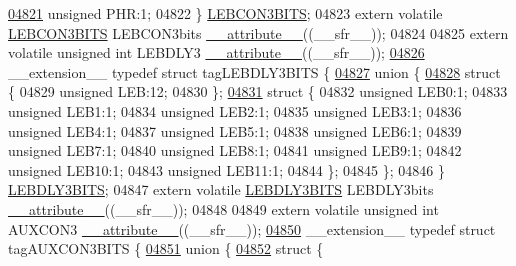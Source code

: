 \begin{DoxyCode}
\hypertarget{a00015_source_l04821}{}\hyperlink{a00014_ae02a9c6926c3a1feac21cec18a520e4a}{04821}   \textcolor{keywordtype}{unsigned} PHR:1;
04822 \} \hyperlink{a00014_dd/d5c/a00578}{LEBCON3BITS};
04823 \textcolor{keyword}{extern} \textcolor{keyword}{volatile} \hyperlink{a00014_dd/d5c/a00578}{LEBCON3BITS} LEBCON3bits \hyperlink{a00015_a493c46f03454991ccc5aa7a6e1dfb2a7}{\_\_attribute\_\_}((\_\_sfr\_\_));
04824 
04825 \textcolor{keyword}{extern} \textcolor{keyword}{volatile} \textcolor{keywordtype}{unsigned} \textcolor{keywordtype}{int}  LEBDLY3 \hyperlink{a00015_a493c46f03454991ccc5aa7a6e1dfb2a7}{\_\_attribute\_\_}((\_\_sfr\_\_));
\hypertarget{a00015_source_l04826}{}\hyperlink{a00014}{04826} \_\_extension\_\_ \textcolor{keyword}{typedef} \textcolor{keyword}{struct }tagLEBDLY3BITS \{
\hypertarget{a00015_source_l04827}{}\hyperlink{a00015}{04827}   \textcolor{keyword}{union }\{
\hypertarget{a00015_source_l04828}{}\hyperlink{a00015}{04828}     \textcolor{keyword}{struct }\{
04829       \textcolor{keywordtype}{unsigned} LEB:12;
04830     \};
\hypertarget{a00015_source_l04831}{}\hyperlink{a00015}{04831}     \textcolor{keyword}{struct }\{
04832       \textcolor{keywordtype}{unsigned} LEB0:1;
04833       \textcolor{keywordtype}{unsigned} LEB1:1;
04834       \textcolor{keywordtype}{unsigned} LEB2:1;
04835       \textcolor{keywordtype}{unsigned} LEB3:1;
04836       \textcolor{keywordtype}{unsigned} LEB4:1;
04837       \textcolor{keywordtype}{unsigned} LEB5:1;
04838       \textcolor{keywordtype}{unsigned} LEB6:1;
04839       \textcolor{keywordtype}{unsigned} LEB7:1;
04840       \textcolor{keywordtype}{unsigned} LEB8:1;
04841       \textcolor{keywordtype}{unsigned} LEB9:1;
04842       \textcolor{keywordtype}{unsigned} LEB10:1;
04843       \textcolor{keywordtype}{unsigned} LEB11:1;
04844     \};
04845   \};
04846 \} \hyperlink{a00014_dc/dac/a00585}{LEBDLY3BITS};
04847 \textcolor{keyword}{extern} \textcolor{keyword}{volatile} \hyperlink{a00014_dc/dac/a00585}{LEBDLY3BITS} LEBDLY3bits \hyperlink{a00015_a493c46f03454991ccc5aa7a6e1dfb2a7}{\_\_attribute\_\_}((\_\_sfr\_\_));
04848 
04849 \textcolor{keyword}{extern} \textcolor{keyword}{volatile} \textcolor{keywordtype}{unsigned} \textcolor{keywordtype}{int}  AUXCON3 \hyperlink{a00015_a493c46f03454991ccc5aa7a6e1dfb2a7}{\_\_attribute\_\_}((\_\_sfr\_\_));
\hypertarget{a00015_source_l04850}{}\hyperlink{a00014}{04850} \_\_extension\_\_ \textcolor{keyword}{typedef} \textcolor{keyword}{struct }tagAUXCON3BITS \{
\hypertarget{a00015_source_l04851}{}\hyperlink{a00015}{04851}   \textcolor{keyword}{union }\{
\hypertarget{a00015_source_l04852}{}\hyperlink{a00015}{04852}     \textcolor{keyword}{struct }\{

\end{DoxyCode}
